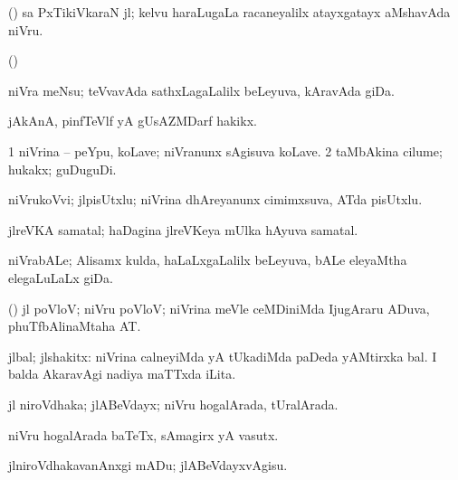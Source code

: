 {\bentry
{} 
\gl{\nA}
\expl{}
\bmng
(\ravi) sa PxTikiVkaraN jl; kelvu haraLugaLa racaneyalilx atayxgatayx aMshavAda niVru. 
\emng
\eentry

\bentry
{} 
\gl{\nA}
\expl{}
\bmng
(\ame)  
\emng
\eentry

\bentry
{} 
\gl{\nA}
\expl{}
\bmng
niVra meNsu; teVvavAda sathxLagaLalilx beLeyuva, kAravAda giDa. 
\emng
\eentry

\bentry
{} 
\gl{\nA}
\expl{}
\bmng
jAkAnA, pinfTeVlf yA gUsAZMDarf hakikx. 
\emng
\eentry

\bentry
{} 
\gl{\nA}
\expl{}
\bmng
\bnum
\num{1} niVrina -- peYpu, koLave; niVranunx sAgisuva koLave. 
\num{2} taMbAkina cilume; hukakx; guDuguDi. 
\enum
\emng
\eentry

\bentry
{} 
\gl{\nA}
\expl{}
\bmng
niVrukoVvi; jlpisUtxlu; niVrina dhAreyanunx cimimxsuva, ATda pisUtxlu. 
\emng
\eentry

\bentry
{} 
\gl{\nA}
\expl{}
\bmng
jlreVKA samatal; haDagina jlreVKeya mUlka hAyuva samatal. 
\emng
\eentry

\bentry
{} 
\gl{\nA}
\expl{}
\bmng
niVrabALe; Alisamx kulda, haLaLxgaLalilx beLeyuva, bALe eleyaMtha elegaLuLaLx giDa. 
\emng
\eentry

\bentry
{} 
\gl{\nA}
\expl{}
\bmng
(\ravi) jl poVloV; niVru poVloV; niVrina meVle ceMDiniMda IjugAraru ADuva, phuTfbAlinaMtaha AT. 
\emng
\eentry

\bentry
{} 
\gl{\nA}
\expl{}
\bmng
jlbal; jlshakitx: 
\banum
{} niVrina calneyiMda yA tUkadiMda paDeda yAMtirxka bal. 
 I balda AkaravAgi nadiya maTTxda iLita. 
\eanum
\emng
\eentry

\bentry
{} 
\gl{\gu}
\expl{}
\bmng
jl niroVdhaka; jlABeVdayx; niVru hogalArada, tUralArada. 
\emng
\eentry

\bentry
{} 
\gl{\nA}
\expl{}
\bmng
niVru hogalArada baTeTx, sAmagirx yA vasutx. 
\emng
\eentry

\bentry
{} 
\gl{\sakirx}
\expl{}
\bmng
jlniroVdhakavanAnxgi mADu; jlABeVdayxvAgisu. 
\emng
\eentry

}
